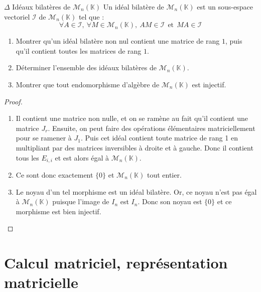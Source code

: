 \documentclass[french,a4paper]{article}
\newcommand{\K}{\mathbb{K}}
\theoremstyle{plain}
\theoremstyle{definition}
\theoremstyle{remark}
\begin{document}
\begin{ex}{$\Delta$ Idéaux bilatères de $\mathcal{M}_n(\K)$}
	Un idéal bilatère de $\mathcal{M}_n(\K)$ est un sous-espace vectoriel $\mathcal{I}$ de $\mathcal{M}_n(\K)$ tel que : $$\forall A\in\mathcal{I},\ \forall M\in\mathcal{M}_n(\K),\ AM\in\mathcal{I} \ \ \text{et} \ \ MA\in\mathcal{I}$$
	\begin{enumerate}
		\item Montrer qu'un idéal bilatère non nul contient une matrice de rang $1$, puis qu'il contient toutes les matrices de rang $1$.
		\item Déterminer l'ensemble des idéaux bilatères de $\mathcal{M}_n(\K)$.
		\item Montrer que tout endomorphisme d'algèbre de $\mathcal{M}_n(\K)$ est injectif.
	\end{enumerate}
\end{ex}
\begin{proof}
	\begin{enumerate}
		\item Il contient une matrice non nulle, et on se ramène au fait qu'il contient une matrice $J_r$. Ensuite, on peut faire des opérations élémentaires matriciellement pour se ramener à $J_1$. Puis cet idéal contient toute matrice de rang 1 en multipliant par des matrices inversibles à droite et à gauche. Donc il contient tous les $E_{i,i}$ et est alors égal à $\mathcal{M}_n(\K)$.
		\item Ce sont donc exactement $\{0\}$ et $\mathcal{M}_n(\K)$ tout entier.
		\item Le noyau d'un tel morphisme est un idéal bilatère. Or, ce noyau n'est pas égal à $\mathcal{M}_n(\K)$ puisque l'image de $I_n$ est $I_n$. Donc son noyau est $\{0\}$ et ce morphisme est bien injectif.
	\end{enumerate}
\end{proof}

\section{Calcul matriciel, représentation matricielle}
\end{document}
